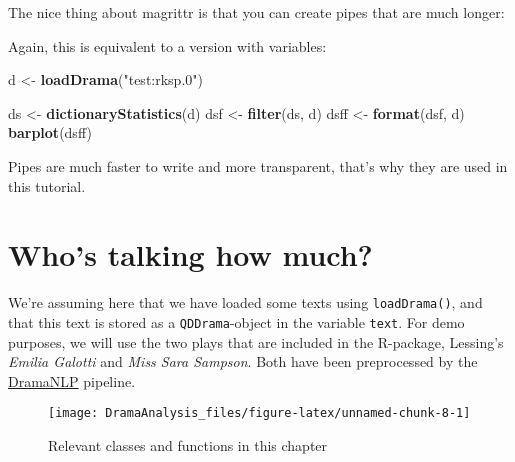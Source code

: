 \documentclass[]{book}
\newenvironment{Shaded}{\begin{snugshade}}{\end{snugshade}}
\newcommand{\KeywordTok}[1]{\textcolor[rgb]{0.13,0.29,0.53}{\textbf{#1}}}
\newcommand{\NormalTok}[1]{#1}
\newcommand{\OperatorTok}[1]{\textcolor[rgb]{0.81,0.36,0.00}{\textbf{#1}}}
\newcommand{\StringTok}[1]{\textcolor[rgb]{0.31,0.60,0.02}{#1}}
\begin{document}
The nice thing about magrittr is that you can create pipes that are much longer:

\begin{Shaded}
\end{Shaded}

Again, this is equivalent to a version with variables:

\begin{Shaded}
\begin{Highlighting}[]
\NormalTok{d <-}\StringTok{ }\KeywordTok{loadDrama}\NormalTok{(}\StringTok{"test:rksp.0"}\NormalTok{)}

\NormalTok{ds <-}\StringTok{ }\KeywordTok{dictionaryStatistics}\NormalTok{(d)}
\NormalTok{dsf <-}\StringTok{ }\KeywordTok{filter}\NormalTok{(ds, d)}
\NormalTok{dsff <-}\StringTok{ }\KeywordTok{format}\NormalTok{(dsf, d)}
\KeywordTok{barplot}\NormalTok{(dsff)}
\end{Highlighting}
\end{Shaded}

Pipes are much faster to write and more transparent, that's why they are used in this tutorial.

\hypertarget{who-how-much}{%
\chapter{Who's talking how much?}\label{who-how-much}}

We're assuming here that we have loaded some texts using \texttt{loadDrama()}, and that this text is stored as a \texttt{QDDrama}-object in the variable \texttt{text}. For demo purposes, we will use the two plays that are included in the R-package, Lessing's \emph{Emilia Galotti} and \emph{Miss Sara Sampson}. Both have been preprocessed by the \href{https://github.com/quadrama/DramaNLP}{DramaNLP} pipeline.

\begin{figure}
\texttt{[image: DramaAnalysis\_files/figure-latex/unnamed-chunk-8-1]} \caption{Relevant classes and functions in this chapter}\label{fig:unnamed-chunk-8}
\end{figure}
\end{document}
